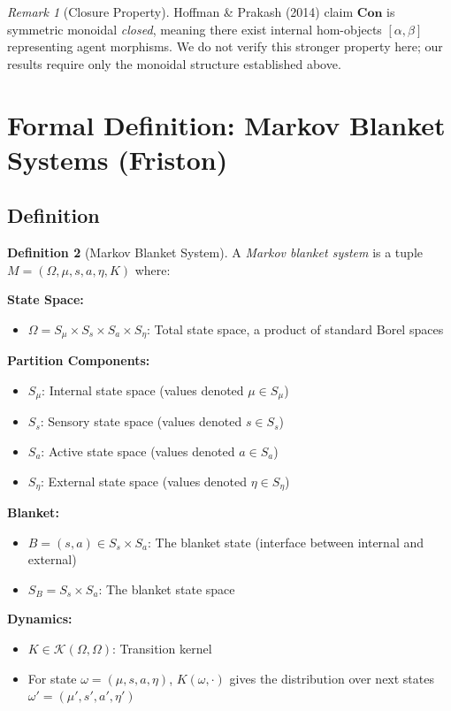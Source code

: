 \documentclass[11pt,a4paper]{article}
\theoremstyle{definition}
\newtheorem{definition}{Definition}[section]
\theoremstyle{plain}
\theoremstyle{remark}
\newtheorem{remark}[definition]{Remark}
\newcommand{\Con}{\mathbf{Con}}
\begin{document}
\begin{remark}[Closure Property]
Hoffman \& Prakash (2014) claim $\Con$ is symmetric monoidal \emph{closed}, meaning there exist internal hom-objects $[\alpha, \beta]$ representing agent morphisms. We do not verify this stronger property here; our results require only the monoidal structure established above.
\end{remark}

\section{Formal Definition: Markov Blanket Systems (Friston)}

\subsection{Definition}

\begin{definition}[Markov Blanket System]\label{def:mb-system}
A \emph{Markov blanket system} is a tuple $M = (\Omega, \mu, s, a, \eta, K)$ where:

\textbf{State Space:}
\begin{itemize}
    \item $\Omega = S_\mu \times S_s \times S_a \times S_\eta$: Total state space, a product of standard Borel spaces
\end{itemize}

\textbf{Partition Components:}
\begin{itemize}
    \item $S_\mu$: Internal state space (values denoted $\mu \in S_\mu$)
    \item $S_s$: Sensory state space (values denoted $s \in S_s$)
    \item $S_a$: Active state space (values denoted $a \in S_a$)
    \item $S_\eta$: External state space (values denoted $\eta \in S_\eta$)
\end{itemize}

\textbf{Blanket:}
\begin{itemize}
    \item $B = (s, a) \in S_s \times S_a$: The blanket state (interface between internal and external)
    \item $S_B = S_s \times S_a$: The blanket state space
\end{itemize}

\textbf{Dynamics:}
\begin{itemize}
    \item $K \in \mathcal{K}(\Omega, \Omega)$: Transition kernel
    \item For state $\omega = (\mu, s, a, \eta)$, $K(\omega, \cdot)$ gives the distribution over next states $\omega' = (\mu', s', a', \eta')$
\end{itemize}
\end{definition}
\end{document}
